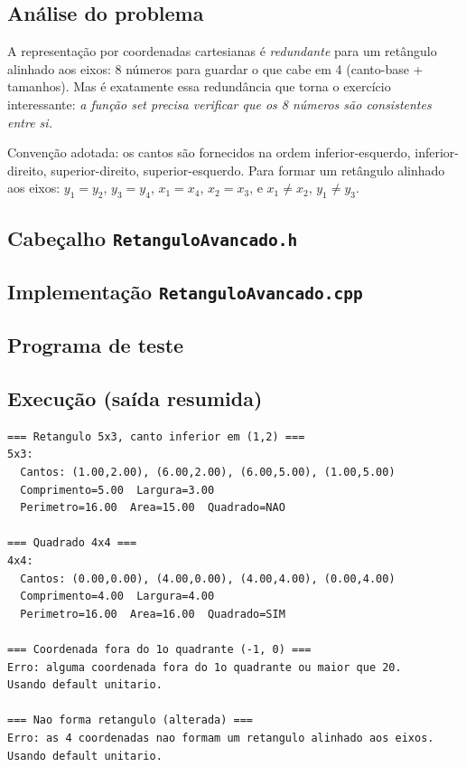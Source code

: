 \documentclass[11pt,a4paper]{article}
\begin{document}
\subsection*{An\'alise do problema}

A representa\c{c}\~ao por coordenadas cartesianas \'e \emph{redundante} para um ret\^angulo alinhado aos eixos: 8 n\'umeros para guardar o que cabe em 4 (canto-base + tamanhos). Mas \'e exatamente essa redund\^ancia que torna o exerc\'icio interessante: \emph{a fun\c{c}\~ao \emph{set} precisa verificar que os 8 n\'umeros s\~ao consistentes entre si.}

Conven\c{c}\~ao adotada: os cantos s\~ao fornecidos na ordem inferior-esquerdo, inferior-direito, superior-direito, superior-esquerdo. Para formar um ret\^angulo alinhado aos eixos: $y_1 = y_2$, $y_3 = y_4$, $x_1 = x_4$, $x_2 = x_3$, e $x_1 \neq x_2$, $y_1 \neq y_3$.

\subsection*{Cabe\c{c}alho \texttt{RetanguloAvancado.h}}



\subsection*{Implementa\c{c}\~ao \texttt{RetanguloAvancado.cpp}}



\subsection*{Programa de teste}



\subsection*{Execu\c{c}\~ao (sa\'ida resumida)}

\begin{saidabox}
\begin{lstlisting}[style=terminal]
=== Retangulo 5x3, canto inferior em (1,2) ===
5x3:
  Cantos: (1.00,2.00), (6.00,2.00), (6.00,5.00), (1.00,5.00)
  Comprimento=5.00  Largura=3.00
  Perimetro=16.00  Area=15.00  Quadrado=NAO

=== Quadrado 4x4 ===
4x4:
  Cantos: (0.00,0.00), (4.00,0.00), (4.00,4.00), (0.00,4.00)
  Comprimento=4.00  Largura=4.00
  Perimetro=16.00  Area=16.00  Quadrado=SIM

=== Coordenada fora do 1o quadrante (-1, 0) ===
Erro: alguma coordenada fora do 1o quadrante ou maior que 20.
Usando default unitario.

=== Nao forma retangulo (alterada) ===
Erro: as 4 coordenadas nao formam um retangulo alinhado aos eixos.
Usando default unitario.
\end{lstlisting}
\end{saidabox}
\end{document}
